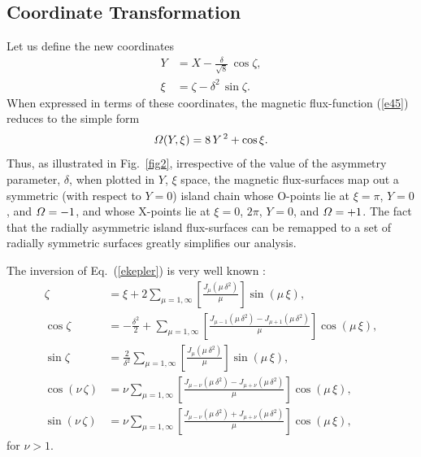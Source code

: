 \documentclass{iopjournal}
\begin{document}
{\subsection{Coordinate Transformation}
Let us define the new coordinates \cite{island}
\begin{align}
Y &= X-\frac{\delta}{\sqrt{8}}\,\cos\zeta,\label{ek}\\[0.5ex]
\xi&=\zeta-\delta^2\,\sin\zeta.\label{ekepler}
\end{align}
When expressed in terms of these coordinates, the magnetic flux-function (\ref{e45}) reduces to the simple
form
\begin{equation}\label{eeven}
{\mit\Omega}(Y,\xi) =8\,Y^{\,2}+\cos\xi.
\end{equation}
Thus, as illustrated in Fig.~\ref{fig2}, irrespective of the value of the asymmetry parameter, $\delta$, when
plotted in $Y$, $\xi$ space, the magnetic flux-surfaces map out a symmetric (with respect to $Y=0$) island
chain whose O-points lie at $\xi=\pi$, $Y=0$,
and ${\mit\Omega}=-1$, and whose X-points lie at $\xi=0$, $2\pi$, $Y=0$, and ${\mit\Omega}=+1$.  The fact that the radially asymmetric island flux-surfaces can
be remapped to a set of radially symmetric surfaces greatly simplifies our analysis. 

The inversion of Eq.~(\ref{ekepler}) is very well known \cite{bc}:
\begin{align}\label{e9a1}
\zeta &= \xi + 2\sum_{\mu=1,\infty}\left[\frac{J_\mu(\mu\,\delta^2)}{\mu}\right]\sin(\mu\,\xi),\\[0.5ex]
\cos\zeta &=-\frac{\delta^2}{2}+\sum_{\mu=1,\infty}\left[\frac{J_{\mu-1}(\mu\,\delta^2)-J_{\mu+1}(\mu\,\delta^2)}{\mu}\right]\cos(\mu\,\xi),\\[0.5ex]
\sin\zeta &=\frac{2}{\delta^2}\sum_{\mu=1,\infty}\left[\frac{J_\mu(\mu\,\delta^2)}{\mu}\right]\sin(\mu\,\xi),\label{e9a3}\\[0.5ex]
\cos(\nu\,\zeta)&= \nu\sum_{\mu=1,\infty}\left[\frac{J_{\mu-\nu}(\mu\,\delta^2)-J_{\mu+\nu}(\mu\,\delta^2)}{\mu}\right]\cos(\mu\,\xi),\\[0.5ex]
\sin(\nu\,\zeta)&= \nu\sum_{\mu=1,\infty}\left[\frac{J_{\mu-\nu}(\mu\,\delta^2)+J_{\mu+\nu}(\mu\,\delta^2)}{\mu}\right]\cos(\mu\,\xi),\
\end{align}
for $\nu>1$. 

}
\end{document}
